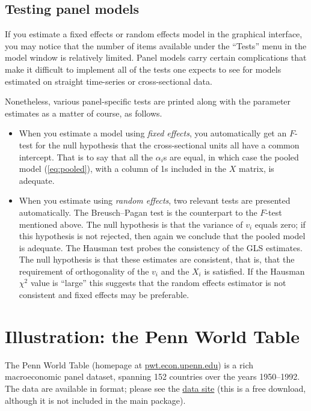 \subsection{Testing panel models}
\label{panel-tests}

If you estimate a fixed effects or random effects model in the
graphical interface, you may notice that the number of items available
under the ``Tests'' menu in the model window is relatively limited.
Panel models carry certain complications that make it difficult to
implement all of the tests one expects to see for models estimated on
straight time-series or cross-sectional data.  

Nonetheless, various panel-specific tests are printed along with the
parameter estimates as a matter of course, as follows.

\begin{itemize}
\item When you estimate a model using \textsl{fixed effects}, you
  automatically get an $F$-test for the null hypothesis that the
  cross-sectional units all have a common intercept.  That is to say
  that all the $\alpha_i$s are equal, in which case the pooled model
  (\ref{eq:pooled}), with a column of 1s included in the $X$ matrix,
  is adequate.
\item When you estimate using \textsl{random effects}, two relevant
  tests are presented automatically.  The Breusch--Pagan test is the
  counterpart to the $F$-test mentioned above.  The null hypothesis is
  that the variance of $v_i$ equals zero; if this hypothesis is not
  rejected, then again we conclude that the pooled model is adequate.
  The Hausman test probes the consistency of the GLS estimates.  The
  null hypothesis is that these estimates are consistent, that is,
  that the requirement of orthogonality of the $v_i$ and the $X_i$ is
  satisfied.  If the Hausman $\chi^2$ value is ``large'' this suggests
  that the random effects estimator is not consistent and fixed
  effects may be preferable.
\end{itemize}



\section{Illustration: the Penn World Table}
\label{PWT}

The Penn World Table (homepage at
\href{http://pwt.econ.upenn.edu/}{pwt.econ.upenn.edu}) is a rich
macroeconomic panel dataset, spanning 152 countries over the years
1950--1992.  The data are available in  format; please see
the 
\href{http://gretl.sourceforge.net/gretl_data.html}{data site} (this
is a free download, although it is not included in the main
 package).

